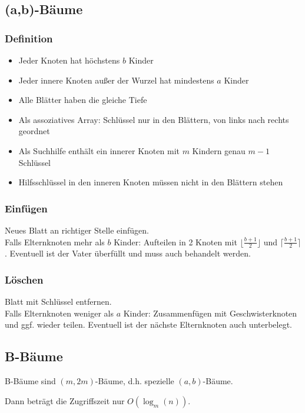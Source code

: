 \documentclass[11pt]{scrartcl}
\begin{document}
\subsection{(a,b)-Bäume}

\subsubsection{Definition}
\begin{itemize}
	\item Jeder Knoten hat höchstens $b$ Kinder
    \item Jeder innere Knoten außer der Wurzel hat mindestens $a$ Kinder
    \item Alle Blätter haben die gleiche Tiefe
    \item Als assoziatives Array: Schlüssel nur in den Blättern, von links nach rechts geordnet
    \item Als Suchhilfe enthält ein innerer Knoten mit $m$ Kindern genau $m - 1$ Schlüssel
    \item Hilfsschlüssel in den inneren Knoten müssen nicht in den Blättern stehen
\end{itemize}

\subsubsection{Einfügen}
Neues Blatt an richtiger Stelle einfügen. \\
Falls Elternknoten mehr als $b$ Kinder: Aufteilen in 2 Knoten mit $\lfloor \frac{b+1}{2} \rfloor$ und $\lceil \frac{b+1}{2} \rceil$. Eventuell ist der Vater überfüllt und muss auch behandelt werden.

\subsubsection{Löschen}
Blatt mit Schlüssel entfernen. \\
Falls Elternknoten weniger als $a$ Kinder: Zusammenfügen mit Geschwisterknoten und ggf. wieder teilen. Eventuell ist der nächste Elternknoten auch unterbelegt.

\subsection{B-Bäume}

B-Bäume sind $(m, 2m)$-Bäume, d.h. spezielle $(a,b)$-Bäume.

Dann beträgt die Zugriffszeit nur $O(\log_m(n))$.
\end{document}
